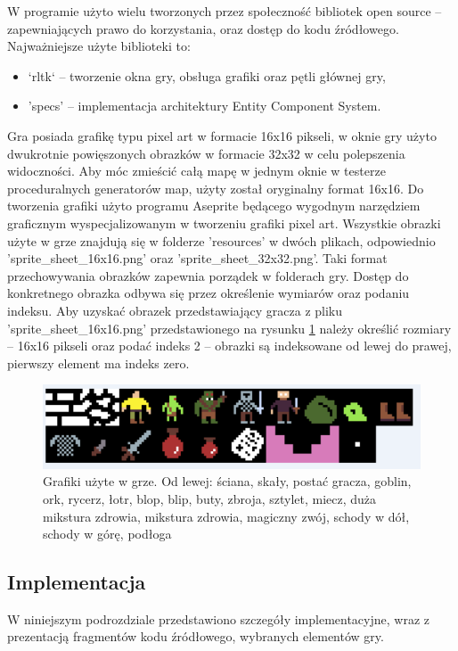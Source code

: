 \documentclass[12pt,twoside]{article}
\begin{document}
W programie użyto wielu tworzonych przez społeczność bibliotek open source -- zapewniających prawo do korzystania, oraz dostęp do kodu źródłowego. Najważniejsze użyte biblioteki to:
\begin{itemize}
	\item `rltk` -- tworzenie okna gry, obsługa grafiki oraz pętli głównej gry,
	\item 'specs' -- implementacja architektury Entity Component System.
\end{itemize}

Gra posiada grafikę typu pixel art w formacie 16x16 pikseli, w oknie gry użyto dwukrotnie powięszonych obrazków w formacie 32x32 w celu polepszenia widoczności. Aby móc zmieścić całą mapę w jednym oknie w testerze proceduralnych generatorów map, użyty został oryginalny format 16x16. Do tworzenia grafiki użyto programu Aseprite \cite{aseprite} będącego wygodnym narzędziem graficznym wyspecjalizowanym w tworzeniu grafiki pixel art. Wszystkie obrazki użyte w grze znajdują się w folderze 'resources' w dwóch plikach, odpowiednio 'sprite\_sheet\_16x16.png' oraz 'sprite\_sheet\_32x32.png'. Taki format przechowywania obrazków zapewnia porządek w folderach gry. Dostęp do konkretnego obrazka odbywa się przez określenie wymiarów oraz podaniu indeksu. Aby uzyskać obrazek przedstawiający gracza z pliku 'sprite\_sheet\_16x16.png' przedstawionego na rysunku \ref{mygame:spritesheet} należy określić rozmiary -- 16x16 pikseli oraz podać indeks 2 -- obrazki są indeksowane od lewej do prawej, pierwszy element ma indeks zero.

\FloatBarrier
\begin{figure}[h]
	\centering
	\includegraphics[width=12cm]{images/mygame/spritesheet.png}
	\caption{Grafiki użyte w grze. Od lewej: ściana, skały, postać gracza, goblin, ork, rycerz, łotr, blop, blip, buty, zbroja, sztylet, miecz, duża mikstura zdrowia, mikstura zdrowia, magiczny zwój, schody w dół, schody w górę, podłoga}
	\label{mygame:spritesheet}
\end{figure}
\FloatBarrier

\subsection{Implementacja}
W niniejszym podrozdziale przedstawiono szczegóły implementacyjne, wraz z prezentacją fragmentów kodu źródłowego, wybranych elementów gry.
\end{document}
